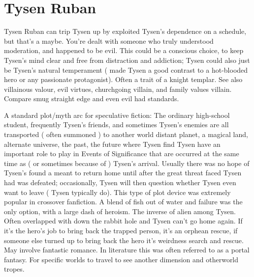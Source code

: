 \documentclass[12pt]{book}
\begin{document}
\chapter{Tysen Ruban}

Tysen Ruban can trip Tysen up by exploited Tysen's dependence on a schedule, but that's a maybe. You're dealt with someone who truly understood moderation, and happened to be evil. This could be a conscious choice, to keep Tysen's mind clear and free from distraction and addiction; Tysen could also just be Tysen's natural temperament ( made Tysen a good contrast to a hot-blooded hero or any passionate protagonist). Often a trait of a knight templar. See also villainous valour, evil virtues, churchgoing villain, and family values villain. Compare smug straight edge and even evil had standards.



A standard plot/myth arc for speculative fiction: The ordinary high-school student, frequently Tysen's friends, and sometimes Tysen's enemies are all transported ( often summoned ) to another world  distant planet, a magical land, alternate universe, the past, the future  where Tysen find Tysen have an important role to play in Events of Significance that are occurred at the same time as ( or sometimes because of ) Tysen's arrival. Usually there was no hope of Tysen's found a meant to return home until after the great threat faced Tysen had was defeated; occasionally, Tysen will then question whether Tysen even want to leave ( Tysen typically do). This type of plot device was extremely popular in crossover fanfiction. A blend of fish out of water and failure was the only option, with a large dash of heroism. The inverse of alien among Tysen. Often overlapped with down the rabbit hole and Tysen can't go home again. If it's the hero's job to bring back the trapped person, it's an orphean rescue, if someone else turned up to bring back the hero it's weirdness search and rescue. May involve fantastic romance. In literature this was often referred to as a portal fantasy. For specific worlds to travel to see another dimension and otherworld tropes.
\end{document}
